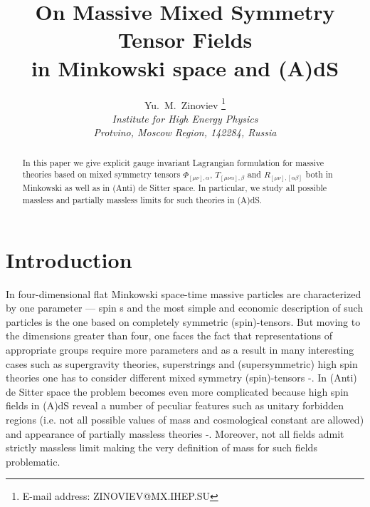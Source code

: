 \documentclass[a4paper,12pt]{article}
\author{Yu.~M.~Zinoviev
       \thanks{E-mail address: ZINOVIEV@MX.IHEP.SU} \\
        {\it Institute for High Energy Physics} \\
        {\it Protvino, Moscow Region, 142284, Russia}}
\title{On Massive Mixed Symmetry Tensor Fields \\
in Minkowski space and (A)dS}
\date{}
\begin{document}
\maketitle

\begin{abstract}
In this paper we give explicit gauge invariant Lagrangian formulation
for massive theories based on mixed symmetry tensors
$\Phi_{[\mu\nu],\alpha}$, $T_{[\mu\nu\alpha],\beta}$ and
$R_{[\mu\nu],[\alpha\beta]}$ both in Minkowski as well as in (Anti) de
Sitter space. In particular, we study all possible massless and partially
massless limits for such theories in (A)dS.
\end{abstract}

\newpage
\setcounter{page}{1}

\section*{Introduction}

In four-dimensional flat Minkowski space-time massive particles are
characterized by one parameter --- spin s and the most simple and
economic description of such particles is the one based on completely
symmetric (spin)-tensors. But moving to the dimensions greater than four,
one faces the fact that representations of appropriate groups
require more parameters and as a result in many interesting cases such
as supergravity theories, superstrings and (supersymmetric) high spin
theories one has to consider different mixed symmetry (spin)-tensors
\cite{Cur86}-\cite{MH02}. In (Anti) de Sitter space the problem becomes even
more complicated because high spin fields in (A)dS reveal a number of
peculiar features such as unitary forbidden regions (i.e. not all
possible values of mass and cosmological constant are allowed) and
appearance of partially massless theories \cite{DN83}-\cite{DW01c}. Moreover,
not all fields admit strictly massless limit \cite{BMV00} making the
very definition of mass for such fields problematic.
\end{document}
